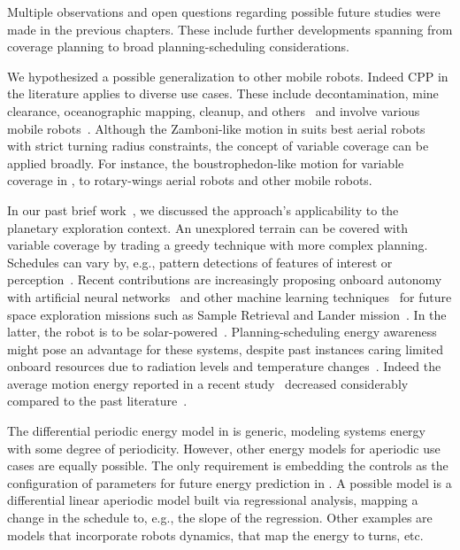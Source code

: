 Multiple observations and open questions regarding possible future studies were made in the previous chapters. These include further developments spanning from coverage planning to broad planning-scheduling considerations.


We hypothesized a possible generalization to other mobile robots. Indeed CPP in the literature applies to diverse use cases. These include decontamination, mine clearance, oceanographic mapping, cleanup, and others~\citep{choset1998coverage} and involve various mobile robots~\citep{galceran2013survey}. Although the Zamboni-like motion in  suits best aerial robots with strict turning radius constraints, the concept of variable coverage can be applied broadly. For instance, the boustrophedon-like motion for variable coverage in , to rotary-wings aerial robots and other mobile robots.

In our past brief work~\citep{seewald2020beyond}, we discussed the approach's applicability to the planetary exploration context. An unexplored terrain can be covered with variable coverage by trading a greedy technique with more complex planning. Schedules can vary by, e.g., pattern detections of features of interest or perception~\citep{ondruska2015scheduled}. Recent contributions are increasingly proposing onboard autonomy with artificial neural networks~\citep{gankidi2017fpga} and other machine learning techniques~\citep{ono2020maars} for future space exploration missions such as Sample Retrieval and Lander mission~\citep{muirhead2019mars}. In the latter, the robot is to be solar-powered~\citep{higa2019vision}. Planning-scheduling energy awareness might pose an advantage for these systems, despite past instances caring limited onboard resources due to radiation levels and temperature changes~\citep{bajracharya2008autonomy,gankidi2017fpga}. Indeed the average motion energy reported in a recent study~\citep{ishigami2011path} decreased considerably compared to the past literature~\citep{krotkov1992performance}.


The differential periodic energy model in  is generic, modeling systems energy with some degree of periodicity. However, other energy models for aperiodic use cases are equally possible. The only requirement is embedding the controls as the configuration of parameters for future energy prediction in . A possible model is a differential linear aperiodic model built via regressional analysis, mapping a change in the schedule to, e.g., the slope of the regression. Other examples are models that incorporate robots dynamics, that map the energy to turns, etc.

